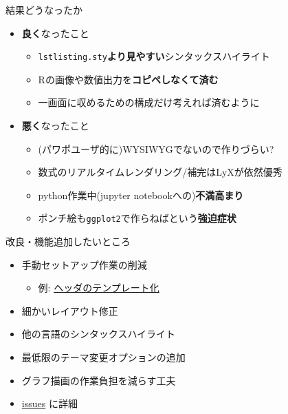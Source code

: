 \documentclass[
  12pt,
  ignorenonframetext,
]{beamer}
\providecommand{\tightlist}{%
  \setlength{\itemsep}{0pt}\setlength{\parskip}{0pt}}
\begin{document}
\begin{frame}[fragile]{結果どうなったか}
\protect\hypertarget{ux7d50ux679cux3069ux3046ux306aux3063ux305fux304b}{}

\begin{itemize}
\tightlist
\item
  \textbf{良く}なったこと

  \begin{itemize}
  \tightlist
  \item
    \texttt{lstlisting.sty}\textbf{より見やすい}シンタックスハイライト
  \item
    Rの画像や数値出力を\textbf{コピペしなくて済む}
  \item
    一画面に収めるための構成だけ考えれば済むように
  \end{itemize}
\item
  \textbf{悪く}なったこと

  \begin{itemize}
  \tightlist
  \item
    (パワポユーザ的に)WYSIWYGでないので作りづらい?
  \item
    数式のリアルタイムレンダリング/補完はLyXが依然優秀
  \item
    python作業中(jupyter notebookへの)\textbf{不満高まり}
  \item
    ポンチ絵も\texttt{ggplot2}で作らねばという\textbf{強迫症状}
  \end{itemize}
\end{itemize}

\end{frame}

\begin{frame}{改良・機能追加したいところ}
\protect\hypertarget{ux6539ux826fux6a5fux80fdux8ffdux52a0ux3057ux305fux3044ux3068ux3053ux308d}{}

\begin{itemize}
\tightlist
\item
  手動セットアップ作業の削減

  \begin{itemize}
  \tightlist
  \item
    例:
    \href{https://atusy.github.io/tokyor85-original-rmd-format}{ヘッダのテンプレート化}
  \end{itemize}
\item
  細かいレイアウト修正
\item
  他の言語のシンタックスハイライト
\item
  最低限のテーマ変更オプションの追加
\item
  グラフ描画の作業負担を減らす工夫
\item
  \href{https://github.com/Gedevan-Aleksizde/my_latex_templates/labels/enhancement}{issues}
  に詳細
\end{itemize}

\end{frame}
\end{document}
